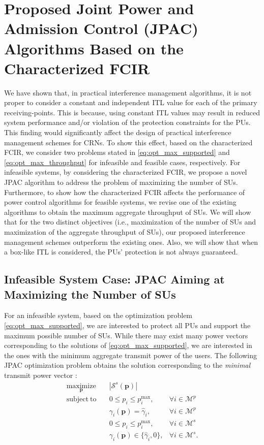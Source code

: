 \documentclass[journal,twoside]{IEEEtran}
\newcommand{\s}{\mathcal{S}}
\newcommand{\M}{\mathcal{M}}
\newcommand{\pimax}{p_i^{\mathrm{max}}}
\newcommand{\pbold}{\mathbf{p}}
\newcommand{\gammai}{\gamma_i}
\newcommand{\gammaihat}{\mathit{\widehat{\gamma}}_i}
\begin{document}
\section{Proposed Joint Power and Admission Control (JPAC) Algorithms Based on the Characterized FCIR}
	\label{sec:proposed_algorithm}

We have shown that, in practical interference management algorithms,  it is not proper to consider a constant and independent ITL value for each of the primary receiving-points. This is because, using constant ITL values may result in reduced system performance and/or violation of the protection constraints for the PUs. This finding would significantly affect
	the design of practical interference management schemes for CRNs. To show this effect, based on the characterized FCIR, we consider two problems stated in \eqref{eq:opt_max_supported} and \eqref{eq:opt_max_throughput} for infeasible and feasible cases, respectively. For infeasible systems, by considering the characterized FCIR, we propose a novel JPAC algorithm to address the problem of maximizing the number of SUs. Furthermore, to show how the characterized FCIR affects the performance of power control algorithms for feasible systems, we revise one of the existing algorithms to obtain the maximum aggregate throughput of SUs. We will show that for the two distinct objectives (i.e., maximization of the number of SUs and maximization of the aggregate throughput of SUs), our proposed interference management schemes outperform the existing ones.  Also, we will show that when a box-like ITL is considered, the PUs' protection is not always guaranteed. 
	
	
\subsection{Infeasible System Case: JPAC Aiming at Maximizing the Number of SUs}
	
	For an infeasible system, based on the optimization problem \eqref{eq:opt_max_supported}, we are interested to protect all PUs and support the maximum possible number of SUs. While there may exist many power vectors corresponding to the solutions of \eqref{eq:opt_max_supported}, we are interested in the ones with the minimum aggregate transmit power of the users. The following JPAC optimization problem obtains the solution corresponding to the \emph{minimal} transmit power vector \cite{monemi_ESRPA}:
	\begin{align}
\label{eq:opt_max_supported2}
				\underset{\pbold}{\mathrm{maximize}}& \quad |\s^s(\pbold)|   
		 \nonumber  \\
		 \mathrm{subject\ to} &\quad 0\leq p_i \leq \pimax, & \forall i\in\M^p
\nonumber \\
		 & \quad \gammai(\pbold)= \gammaihat,  & \forall i\in\M^p
		 \nonumber \\
	 	& \quad 0\leq p_i \leq \pimax, & \forall i\in\M^s
	 	\nonumber \\
	 	& \quad \gammai(\pbold)\in \{ \gammaihat,0\}, & \forall i\in\M^s.
	\end{align}
		
\end{document}
